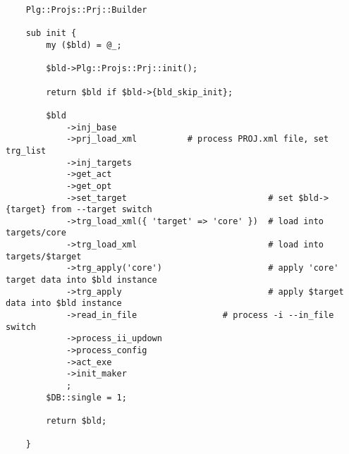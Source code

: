  
 
 
 
 

\begin{verbatim}
	Plg::Projs::Prj::Builder

	sub init {
	    my ($bld) = @_;
	
	    $bld->Plg::Projs::Prj::init();
	
	    return $bld if $bld->{bld_skip_init};
	
	    $bld
	        ->inj_base
	        ->prj_load_xml          # process PROJ.xml file, set trg_list
	        ->inj_targets
	        ->get_act
	        ->get_opt
	        ->set_target                            # set $bld->{target} from --target switch
	        ->trg_load_xml({ 'target' => 'core' })  # load into targets/core 
	        ->trg_load_xml                          # load into targets/$target
	        ->trg_apply('core')                     # apply 'core' target data into $bld instance
	        ->trg_apply                             # apply $target data into $bld instance
	        ->read_in_file                 # process -i --in_file switch
	        ->process_ii_updown               
	        ->process_config
	        ->act_exe
	        ->init_maker
	        ;
		$DB::single = 1;
	
	    return $bld;
	
	}
\end{verbatim}

